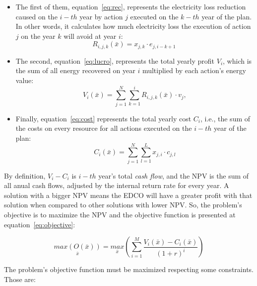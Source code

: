 \begin{itemize}

  \item The first of them, equation~\ref{eq:rec}, represents the electricity loss reduction caused on the $i-th$ year by action $j$ executed on the $k-th$ year of the plan.
        In other words, it calculates how much electricity loss the execution of action $j$ on the year $k$ will avoid at year $i$:
    \begin{equation}
	\label{eq:rec}
	R_{i,j,k}(\bar{x}) = x_{j, k} \cdot e_{j, i - k + 1} \ %
    \end{equation}

  \item The second, equation~\ref{eq:lucro}, represents the total yearly profit $V_i$, which is the sum of all energy recovered on year $i$ multiplied by each action's energy value:
    \begin{equation}
      \label{eq:lucro}
	V_{i}(\bar{x}) = \sum_{j=1}^{N} \sum_{k=1}^{i} R_{i, j, k}(\bar{x}) \cdot v_j,
    \end{equation}
    
  \item Finally, equation~\ref{eq:cost} represents the total yearly cost $C_i$, i.e., the sum of the costs on every resource for all actions executed on the $i-th$ year of the plan:
    \begin{equation}
    \label{eq:cost}
    C_{i}(\bar{x}) =  \sum_{j=1}^{N} \sum_{l=1}^{L} x_{j, i} \cdot c_{j,l}
    \end{equation}
    

\end{itemize}

By definition, $V_i - C_i$ is $i-th$ year's total \textit{cash flow}, and the NPV is the sum of all anual cash flows, 
adjusted by the internal return rate for every year. A solution with a bigger NPV means the EDCO will have a greater profit with that solution when compared
to other solutions with lower NPV. So, the problem's objective is to maximize the NPV and the objective function is presented at equation~\ref{eq:objective}:

\begin{equation}
    \label{eq:objective}
    \underset{\bar{x}}{max(O(\bar{x}))} = \underset{\bar{x}}{max}\left(\sum_{i=1}^{M} \frac{V_i(\bar{x}) - C_i(\bar{x})}{(1 + r)^i}\right)
\end{equation}

The problem's objective function must be maximized respecting some constraints. Those are:

